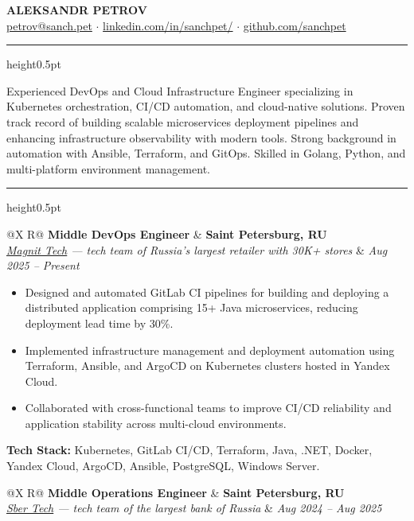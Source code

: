 \documentclass[10pt,a4paper]{article}
\makeatletter
\newcommand{\bulletblock}[1]{%
  \begin{minipage}[t]{\linewidth}\RaggedRight #1\end{minipage}%
}
\newlength{\SectionGap}\setlength{\SectionGap}{6mm}   %
\newlength{\JobGap}\setlength{\JobGap}{4mm}           %
\newcommand{\thinrule}{\vspace{1mm}\color{rulegray}\hrule height0.5pt\color{black}\vspace{2mm}}
\newcommand{\cvsection}[1]{\vspace{\SectionGap}{\bfseries\Large #1}\par\thinrule}
\newcommand{\rowheader}[4]{%
  \noindent\begin{tabularx}{\textwidth}{@{}X R@{}}
    \textbf{#1} & \textbf{#2} \\
    \textit{#3} & \textit{#4}
  \end{tabularx}\par
}
\newcommand{\jobheader}[4]{%
  \vspace{\JobGap}%
  \rowheader{#1}{#2}{#3}{#4}%
}
\makeatother
\begin{document}
\begin{center}
  {\fontsize{28pt}{28pt}\selectfont\textbf{ALEKSANDR PETROV}}\\[2mm]
  {\fontsize{10pt}{10pt}\selectfont
  \href{mailto:petrov@sanch.pet}{petrov@sanch.pet} $\cdot$ 
  \href{https://www.linkedin.com/in/sanchpet/}{linkedin.com/in/sanchpet/} $\cdot$
  \href{https://github.com/sanchpet}{github.com/sanchpet}}
\end{center}

\cvsection{Professional Summary}

Experienced DevOps and Cloud Infrastructure Engineer specializing in Kubernetes orchestration, CI/CD automation, and cloud-native solutions. Proven track record of building scalable microservices deployment pipelines and enhancing infrastructure observability with modern tools. Strong background in automation with Ansible, Terraform, and GitOps. Skilled in Golang, Python, and multi-platform environment management.

\cvsection{Work Experience}

\jobheader{\textbf{Middle DevOps Engineer}}{\textbf{Saint Petersburg, RU}}
{\href{https://magnit.tech}{Magnit Tech} — {\textit{tech team of Russia's largest retailer with 30K+ stores}}}
{Aug 2025 -- Present}

\begin{itemize}
  \item \bulletblock{Designed and automated GitLab CI pipelines for building and deploying a distributed application comprising 15+ Java microservices, reducing deployment lead time by 30\%.}
  \item \bulletblock{Implemented infrastructure management and deployment automation using Terraform, Ansible, and ArgoCD on Kubernetes clusters hosted in Yandex Cloud.}
  \item \bulletblock{Collaborated with cross-functional teams to improve CI/CD reliability and application stability across multi-cloud environments.}
\end{itemize} \vspace{1mm}
\textbf{Tech Stack:} Kubernetes, GitLab CI/CD, Terraform, Java, .NET, Docker, Yandex Cloud, ArgoCD, Ansible, PostgreSQL, Windows Server.

\jobheader{\textbf{Middle Operations Engineer}}{\textbf{Saint Petersburg, RU}}
{\href{https://sbertech.ru}{Sber Tech} — {\textit{tech team of the largest bank of Russia}}}
{Aug 2024 -- Aug 2025}
\end{document}
